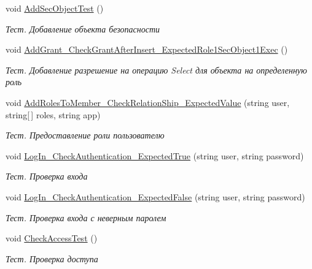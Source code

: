 \begin{DoxyCompactItemize}
void \hyperlink{class_security_1_1_entity_framework_1_1_tests_1_1_security_work_unit_test_a1d69a3b749c56257dcc8c4acf4d650a9}{Add\+Sec\+Object\+Test} ()
\begin{DoxyCompactList}\small\item\em Тест. Добавление объекта безопасности \end{DoxyCompactList}\item 
void \hyperlink{class_security_1_1_entity_framework_1_1_tests_1_1_security_work_unit_test_a5ea44820a8d7883f497bcdd7f320dc98}{Add\+Grant\+\_\+\+Check\+Grant\+After\+Insert\+\_\+\+Expected\+Role1\+Sec\+Object1\+Exec} ()
\begin{DoxyCompactList}\small\item\em Тест. Добавление разрешение на операцию Select для объекта на определенную роль \end{DoxyCompactList}\item 
void \hyperlink{class_security_1_1_entity_framework_1_1_tests_1_1_security_work_unit_test_ad8091cbe39ddb2ddbffaa46701960130}{Add\+Roles\+To\+Member\+\_\+\+Check\+Relation\+Ship\+\_\+\+Expected\+Value} (string user, string\mbox{[}$\,$\mbox{]} roles, string app)
\begin{DoxyCompactList}\small\item\em Тест. Предоставление роли пользователю \end{DoxyCompactList}\item 
void \hyperlink{class_security_1_1_entity_framework_1_1_tests_1_1_security_work_unit_test_a7fa1055e919319077b7507ac458a954e}{Log\+In\+\_\+\+Check\+Authentication\+\_\+\+Expected\+True} (string user, string password)
\begin{DoxyCompactList}\small\item\em Тест. Проверка входа \end{DoxyCompactList}\item 
void \hyperlink{class_security_1_1_entity_framework_1_1_tests_1_1_security_work_unit_test_af0b11e43f67cf2a27b038c61a45fd8aa}{Log\+In\+\_\+\+Check\+Authentication\+\_\+\+Expected\+False} (string user, string password)
\begin{DoxyCompactList}\small\item\em Тест. Проверка входа с неверным паролем \end{DoxyCompactList}\item 
void \hyperlink{class_security_1_1_entity_framework_1_1_tests_1_1_security_work_unit_test_a54916ae7b83147cf599d5b41c477d0d1}{Check\+Access\+Test} ()
\begin{DoxyCompactList}\small\item\em Тест. Проверка доступа \end{DoxyCompactList}\item 

\end{DoxyCompactItemize}
